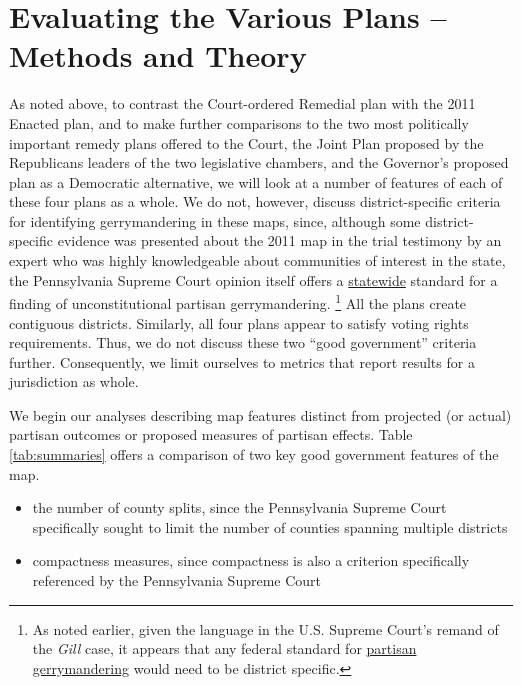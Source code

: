\section{Evaluating the Various Plans -- Methods and Theory}
    As noted above, to contrast the Court-ordered Remedial plan with the 2011 Enacted plan, and to make further comparisons to the two most politically important remedy plans offered to the Court, the Joint Plan proposed by the Republicans leaders of the two legislative chambers, and the Governor’s proposed plan as a Democratic alternative, we will look at a number of features of each of these four plans as a whole.  We do not, however, discuss district-specific criteria for identifying gerrymandering in these maps, since, although some district-specific evidence was presented about the 2011 map in the trial testimony by an expert who was highly knowledgeable about communities of interest in the state, the Pennsylvania Supreme Court opinion itself offers a \underline{statewide} standard for a finding of unconstitutional partisan gerrymandering. 
        \footnote{As noted earlier, given the language in the U.S. Supreme Court’s remand of the \textit{Gill} case, it appears that any federal standard for \underline{partisan gerrymandering} would need to be district specific.}
    All the plans create contiguous districts. Similarly, all four plans appear to satisfy voting rights requirements. Thus, we do not discuss these two ``good government” criteria further. Consequently, we limit ourselves to metrics that report results for a jurisdiction as whole. 
\par
    We begin our analyses describing map features distinct from projected (or actual) partisan outcomes or proposed measures of partisan effects. Table \ref{tab:summaries} offers a comparison of two key good government features of the map.
\begin{itemize}
    \item the number of county splits, since the Pennsylvania Supreme Court specifically sought to limit the number of counties spanning multiple districts
    \item compactness measures, since compactness is also a criterion specifically referenced by the Pennsylvania Supreme Court
\end{itemize}
\par
